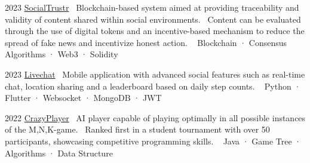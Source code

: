 \documentclass{tccv}
\begin{document}
\begin{yearlist}

\item{2023}
     {\href{https://github.com/manuelarto/socialtrustr}{SocialTrustr}}
     {\textbullet~Blockchain-based system aimed at providing traceability and validity of content shared within social environments.
     \textbullet~Content can be evaluated through the use of digital tokens and an incentive-based mechanism to reduce the spread of fake news and incentivize honest action. \newline
     \textbullet~ Blockchain · Consensus Algorithms · Web3 · Solidity}
\item{2023}
     {\href{https://github.com/manuelarto/livechat}{Livechat}}
     {\textbullet~Mobile application with advanced social features such as real-time chat, location sharing and a leaderboard based on daily step counts. \newline
    \textbullet~ Python · Flutter · Websocket · MongoDB · JWT}
\item{2022}
     {\href{https://github.com/manuelarto/crazyplayer}{CrazyPlayer}}
     {\textbullet~AI player capable of playing optimally in all possible instances of the M,N,K-game. \newline
     \textbullet~Ranked first in a student tournament with over 50 participants, showcasing competitive programming skills. \newline
    \textbullet~ Java · Game Tree · Algorithms · Data Structure}

\end{yearlist}






\end{document}
